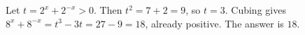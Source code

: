 Let $ t=2^x+2^{-x}>0 $. Then $ t^2=7+2=9 $, so $ t=3 $. Cubing gives $ 8^x+8^{-x}=t^3-3t=27-9=18 $, already positive. The answer is $\boxed{18}$.
